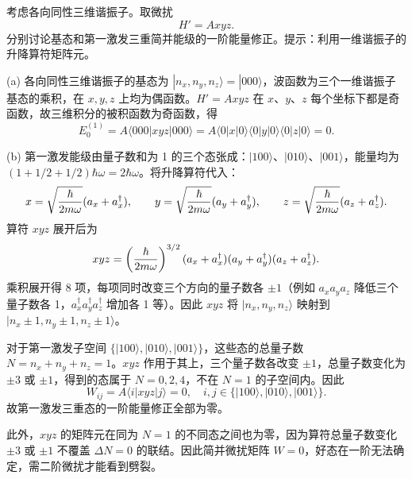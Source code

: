 \begin{question}
考虑各向同性三维谐振子。取微扰
\[
H'=Axyz.
\]
分别讨论基态和第一激发三重简并能级的一阶能量修正。提示：利用一维谐振子的升降算符矩阵元。
\end{question}
\begin{solution}
(a) 各向同性三维谐振子的基态为 $|n_x,n_y,n_z\rangle=|000\rangle$，波函数为三个一维谐振子基态的乘积，在 $x,y,z$ 上均为偶函数。$H'=Axyz$ 在 $x$、$y$、$z$ 每个坐标下都是奇函数，故三维积分的被积函数为奇函数，得
\[
E_0^{(1)}=A\langle000|xyz|000\rangle
=A\langle0|x|0\rangle\langle0|y|0\rangle\langle0|z|0\rangle=0.
\]

(b) 第一激发能级由量子数和为 1 的三个态张成：$|100\rangle$、$|010\rangle$、$|001\rangle$，能量均为 $(1+1/2+1/2)\hbar\omega=2\hbar\omega$。将升降算符代入：
\[
x=\sqrt{\hbar\over2m\omega}(a_x+a_x^\dagger),\qquad
y=\sqrt{\hbar\over2m\omega}(a_y+a_y^\dagger),\qquad
z=\sqrt{\hbar\over2m\omega}(a_z+a_z^\dagger).
\]
算符 $xyz$ 展开后为
\[
xyz = \left({\hbar\over2m\omega}\right)^{3/2}(a_x+a_x^\dagger)(a_y+a_y^\dagger)(a_z+a_z^\dagger).
\]
乘积展开得 8 项，每项同时改变三个方向的量子数各 $\pm1$（例如 $a_x a_y a_z$ 降低三个量子数各 1，$a_x^\dagger a_y^\dagger a_z^\dagger$ 增加各 1 等）。因此 $xyz$ 将 $|n_x,n_y,n_z\rangle$ 映射到 $|n_x\pm1,n_y\pm1,n_z\pm1\rangle$。

对于第一激发子空间 $\{|100\rangle,|010\rangle,|001\rangle\}$，这些态的总量子数 $N=n_x+n_y+n_z=1$。$xyz$ 作用于其上，三个量子数各改变 $\pm1$，总量子数变化为 $\pm3$ 或 $\pm1$，得到的态属于 $N=0,2,4$，不在 $N=1$ 的子空间内。因此
\[
W_{ij}=A\langle i|xyz|j\rangle = 0,\quad i,j\in\{|100\rangle,|010\rangle,|001\rangle\}.
\]
故第一激发三重态的一阶能量修正全部为零。

此外，$xyz$ 的矩阵元在同为 $N=1$ 的不同态之间也为零，因为算符总量子数变化 $\pm3$ 或 $\pm1$ 不覆盖 $\Delta N=0$ 的联结。因此简并微扰矩阵 $W=0$，好态在一阶无法确定，需二阶微扰才能看到劈裂。
\end{solution}

